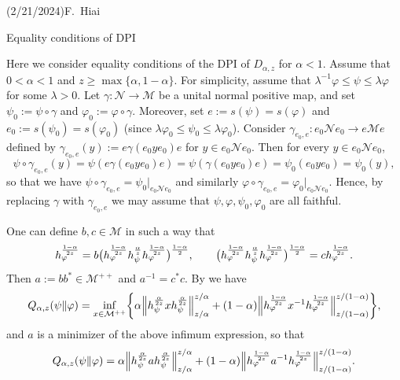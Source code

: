 \documentclass[11pt,reqno]{article}
\numberwithin{equation}{section}
\def\cM{\mathcal{M}}
\def\cN{\mathcal{N}}
\def\ffi{\varphi}
\begin{document}
\allowdisplaybreaks

\noindent (2/21/2024)\hfill F.\ Hiai

\medskip
\centerline{\LARGE Equality conditions of DPI}

\bigskip
Here we consider equality conditions of the DPI of $D_{\alpha,z}$ for $\alpha<1$. Assume that $0<\alpha<1$
and $z\ge\max\{\alpha,1-\alpha\}$. For simplicity, assume that $\lambda^{-1}\ffi\le\psi\le\lambda\ffi$ for some
$\lambda>0$. Let $\gamma:\cN\to\cM$ be a unital normal positive map, and set $\psi_0:=\psi\circ\gamma$ and
$\ffi_0:=\ffi\circ\gamma$. Moreover, set $e:=s(\psi)=s(\ffi)$ and $e_0:=s(\psi_0)=s(\ffi_0)$ (since
$\lambda\ffi_0\le\psi_0\le\lambda\ffi_0$). Consider $\gamma_{e_0,e}:e_0\cN e_0\to e\cM e$ defined by
$\gamma_{e_0,e}(y):=e\gamma(e_0ye_0)e$ for $y\in e_0\cN e_0$. Then for every $y\in e_0\cN e_0$,
\[
\psi\circ\gamma_{e_0,e}(y)=\psi(e\gamma(e_0ye_0)e)=\psi(\gamma(e_0ye_0)e)=\psi_0(e_0ye_0)=\psi_0(y),
\]
so that we have $\psi\circ\gamma_{e_0,e}=\psi_0|_{e_0\cN e_0}$ and similarly
$\ffi\circ\gamma_{e_0,e}=\ffi_0|_{e_0\cN e_0}$. Hence, by replacing $\gamma$ with $\gamma_{e_0,e}$ we may
assume that $\psi,\ffi,\psi_0,\ffi_0$ are all faithful.

One can define $b,c\in\cM$ in such a way that
\begin{align}\label{F-1}
h_\ffi^{1-\alpha\over2z}
=b\bigl(h_\ffi^{1-\alpha\over2z}h_\psi^{\alpha\over z}h_\ffi^{1-\alpha\over2z}\bigr)^{1-\alpha\over2},\qquad
\bigl(h_\ffi^{1-\alpha\over2z}h_\psi^{\alpha\over z}h_\ffi^{1-\alpha\over2z}\bigr)^{1-\alpha\over2}
=ch_\ffi^{1-\alpha\over2z}.
\end{align}
Then $a:=bb^*\in\cM^{++}$ and $a^{-1}=c^*c$. By \cite[Theorem 1\,(vi)]{Ka1} we have
\begin{align}\label{F-2}
Q_{\alpha,z}(\psi\|\ffi)
=\inf_{x\in\cM^{++}}\biggl\{\alpha\Big\|h_\psi^{\alpha\over2z}xh_\psi^{\alpha\over2z}\Big\|_{z/\alpha}^{z/\alpha}
+(1-\alpha)\Big\|h_\ffi^{1-\alpha\over2z}x^{-1}h_\ffi^{1-\alpha\over2z}\Big\|_{z/(1-\alpha)}^{z/(1-\alpha)}\biggr\},
\end{align}
and $a$ is a minimizer of the above infimum expression, so that
\begin{align}\label{F-3}
Q_{\alpha,z}(\psi\|\ffi)=\alpha\Big\|h_\psi^{\alpha\over2z}ah_\psi^{\alpha\over2z}\Big\|_{z/\alpha}^{z/\alpha}
+(1-\alpha)\Big\|h_\ffi^{1-\alpha\over2z}a^{-1}h_\ffi^{1-\alpha\over2z}\Big\|_{z/(1-\alpha)}^{z/(1-\alpha)}.
\end{align}
\end{document}
